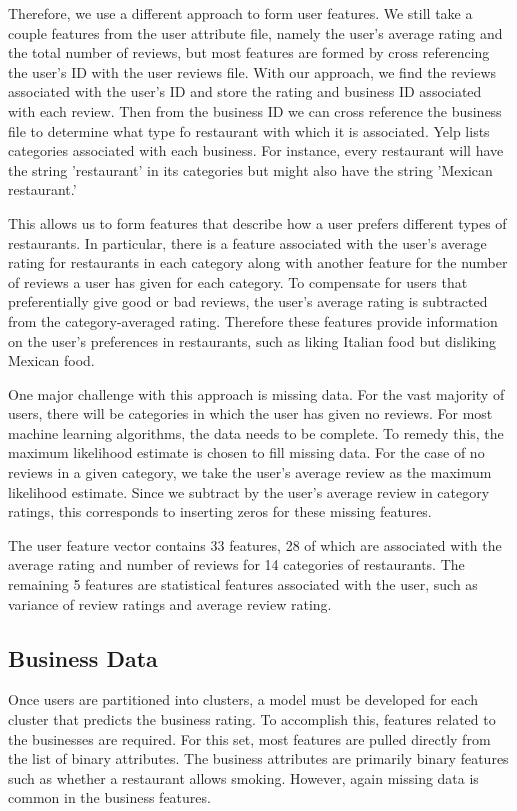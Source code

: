 \documentclass[11pt]{article}
\begin{document}
Therefore, we use a different approach to form user features. We still take a couple features from the user attribute file, namely the user's average rating and the total number of reviews, but most features are formed by cross referencing the user's ID with the user reviews file. With our approach, we find the reviews associated with the user's ID and store the rating and business ID associated with each review. Then from the business ID we can cross reference the business file to determine what type fo restaurant with which it is associated.  Yelp lists categories associated with each business. For instance, every restaurant will have the string 'restaurant' in its categories but might also have the string 'Mexican restaurant.'

This allows us to form features that describe how a user prefers different types of restaurants. In particular, there is a feature associated with the user's average rating for restaurants in each category along with another feature for the number of reviews a user has given for each category. To compensate for users that preferentially give good or bad reviews, the user's average rating is subtracted from the category-averaged rating. Therefore these features provide information on the user's preferences in restaurants, such as liking Italian food but disliking Mexican food.

One major challenge with this approach is missing data. For the vast majority of users, there will be categories in which the user has given no reviews. For most machine learning algorithms, the data needs to be complete. To remedy this, the maximum likelihood estimate is chosen to fill missing data. For the case of no reviews in a given category, we take the user's average review as the maximum likelihood estimate. Since we subtract by the user's average review in category ratings, this corresponds to inserting zeros for these missing features. 

The user feature vector contains 33 features, 28 of which are associated with the average rating and number of reviews for 14 categories of restaurants. The remaining 5 features are statistical features associated with the user, such as variance of review ratings and average review rating.

\subsection{Business Data}

Once users are partitioned into clusters, a model must be developed for each cluster that predicts the business rating. To accomplish this, features related to the businesses are required. For this set, most features are pulled directly from the list of binary attributes. The business attributes are primarily binary features such as whether a restaurant allows smoking. However, again missing data is common in the business features.
\end{document}
